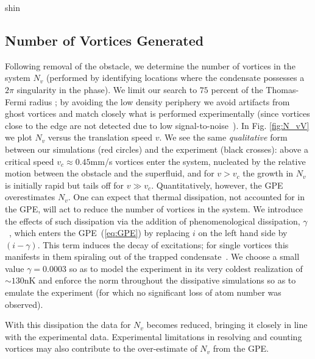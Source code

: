 \begin{chapter}{\label{cha:shin}shin}
\subsection{Number of Vortices Generated}
Following removal of the obstacle, we determine the number of vortices in the system $N_v$ (performed by identifying locations where the condensate possesses a $2\pi$ singularity in the phase).  
We limit our search to $75$ percent
 of the Thomas-Fermi radius ; by avoiding the low density periphery we avoid artifacts from ghost vortices and match closely what is performed experimentally (since vortices close to the edge are not detected due to low signal-to-noise~\citep{shin_private}).  In Fig. \ref{fig:N_vV} we plot $N_v$ versus the translation speed $v$.  We see the same {\it qualitative} form between our simulations (red circles) and the experiment (black crosses): above a critical speed $v_c \approx 0.45$mm/s vortices enter the system, nucleated by the relative motion between the obstacle and the superfluid, and for $v>v_c$ the growth in $N_v$ is initially rapid but tails off for $v\gg v_c$. Quantitatively, however, the GPE overestimates $N_v$.   One can expect that thermal dissipation, not accounted for in the GPE, will act to reduce the number of vortices in the system.  We introduce the effects of such dissipation via the addition of phenomenological dissipation, $\gamma$~\citep{choi_morgan_98,tsubota_kasamatsu_02}, which enters the GPE~(\ref{eq:GPE}) by replacing $i$ on the left hand side by $(i-\gamma)$.  This term induces the decay of excitations; for single vortices this manifests in them spiraling out of the trapped condensate~\citep{madarassy_barenghi_08,jackson_proukakis_09,allen_zaremba_13,yan_proukakis_14}.  
We choose a small value $\gamma = 0.0003$ so as to model the experiment in its very coldest realization of $\sim130$nK and enforce the norm throughout the dissipative simulations so as to emulate the experiment (for which no significant loss of atom number was observed).

 With this dissipation the data for $N_v$ becomes reduced, bringing it closely in line with the experimental data. Experimental limitations in resolving and counting vortices may also contribute to the over-estimate of $N_v$ from the GPE.


\end{chapter}
